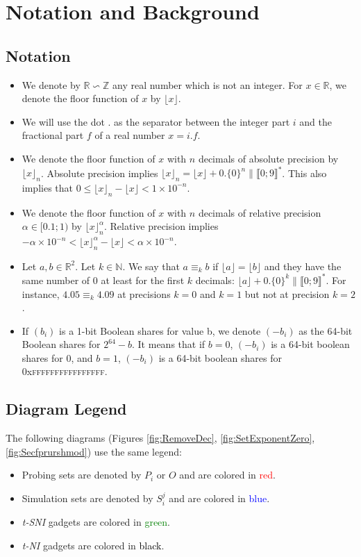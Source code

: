\documentclass[runningheads]{llncs}
\begin{document}
\section{Notation and Background}\label{sec:background}
\subsection{Notation}
\begin{itemize}
  \item We denote by $\mathbb{R}\backsim \mathbb{Z}$ any real number which is not an integer. For $x\in\mathbb{R}$, we denote the floor function of $x$ by $\lfloor x \rfloor$.
  \item We will use the dot $.$ as the separator between the integer part $i$ and the fractional part $f$ of a real number $x=i.f$.
  \item We denote the floor function of $x$ with $n$ decimals of absolute precision by $\lfloor x \rfloor_n$. Absolute precision implies $\lfloor x\rfloor_n = \lfloor x \rfloor + 0.\{0\}^n\|\llbracket0;9\rrbracket^*$. This also implies that $0 \leq \lfloor x \rfloor_n - \lfloor x \rfloor < 1\times 10^{-n}$.
  \item We denote the floor function of $x$ with $n$ decimals of relative precision $\alpha\in[\num{0.1};1)$ by $\lfloor x \rfloor_n^\alpha$. Relative precision implies $-\alpha\times 10^{-n} < \lfloor x \rfloor_n^\alpha - \lfloor x \rfloor < \alpha\times 10^{-n}$.
  \item Let $a,b\in\mathbb{R}^2$. Let $k\in\mathbb{N}$. We say that $a\equiv_k b$ if $\lfloor a\rfloor = \lfloor b \rfloor$ and they have the same number of $0$ at least for the first $k$ decimals: $\lfloor a \rfloor + 0.\{0\}^k\|\llbracket0;9\rrbracket^*$. For instance, $\num{4.05} \equiv_k \num{4.09}$ at precisions $k=0$ and $k=1$ but not at precision $k=2$.
  \item If $(b_i)$ is a 1-bit Boolean shares for value b, we denote $(-b_i)$ as the 64-bit Boolean shares for $2^{64} - b$. It means that if $b=0$, $(-b_i)$ is a 64-bit boolean shares for $0$, and
  $b=1$, $(-b_i)$ is a 64-bit boolean shares for 0x\textsc{ffffffffffffffff}.   
\end{itemize}
%
\subsection{Diagram Legend}
The following diagrams (Figures \ref{fig:RemoveDec}, \ref{fig:SetExponentZero},\ref{fig:Secfprurshmod}) use the same legend:\begin{itemize}
    \item Probing sets are denoted by $P_i$ or $O$ and are colored in \textcolor{red}{red}.
    \item Simulation sets are denoted by $S_i^j$ and are colored in \textcolor{blue}{blue}.
    \item \emph{t-SNI} gadgets are colored in \textcolor{green}{green}.
    \item \emph{t-NI} gadgets are colored in \textcolor{black}{black}.
\end{itemize}
% 
\end{document}
